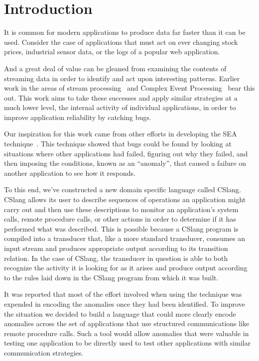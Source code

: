 \section{Introduction}
\label{SEC:introduction}

It is common for modern applications to produce data
far faster than it can be used.
Consider the case of
applications that must act on ever changing stock prices,
industrial sensor data,
or the logs of a popular web application.



And a great deal of value can be gleaned
from examining the contents of streaming data
in order to identify and act upon
interesting patterns.
Earlier work in the areas of stream
processing~\cite{asdf}
and Complex Event Processing~\cite{asdf} bear this
out.
This work aims to take these successes
and apply similar strategies
at a much lower level,
the internal activity of individual applications,
in order to improve application reliability by catching bugs.

Our inspiration for this work came from other efforts in developing
the SEA technique~\cite{ASDF}.
This technique showed that bugs could be found by looking at situations
where other
applications had failed, figuring out why they failed, and then imposing
the conditions, known as an ``anomaly'',
that caused a failure on another application to see how it
responds.

To this end,
we've constructed
a new domain specific language called CSlang.
CSlang allows its user to describe sequences of operations an application
might carry out and
then use these descriptions
to monitor an application's system calls,
remote procedure calls,
or other actions in order to determine if it has
performed what was described.
This is possible because a CSlang program is
compiled into a transducer that,
like a more standard transducer,
consumes an input stream
and produces appropriate output
according to its transition relation.
In the case of CSlang,
the transducer in question is able to
both recognize the activity it is looking for as it arises
and produce output according to the rules laid down in the CSlang
program from which it was built.

It was reported that most of the effort involved when using the technique
was expended in encoding the anomalies once
they had been identified.
To improve the situation we decided to build a language
that could more clearly
encode anomalies across the set of applications that use
structured communications like remote procedure calls.
Such a tool would allow
anomalies that were
valuable in testing one application to be directly used to test other
applications with similar communication strategies.

